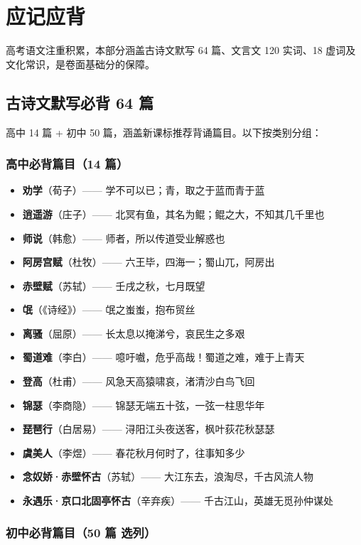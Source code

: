\section{应记应背}

高考语文注重积累，本部分涵盖古诗文默写 64 篇、文言文 120 实词、18 虚词及文化常识，是卷面基础分的保障。

\subsection{古诗文默写必背 64 篇}

高中 14 篇 + 初中 50 篇，涵盖新课标推荐背诵篇目。以下按类别分组：

\subsubsection{高中必背篇目（14 篇）}

\begin{itemize}
  \item \textbf{劝学}（荀子）—— 学不可以已；青，取之于蓝而青于蓝
  \item \textbf{逍遥游}（庄子）—— 北冥有鱼，其名为鲲；鲲之大，不知其几千里也
  \item \textbf{师说}（韩愈）—— 师者，所以传道受业解惑也
  \item \textbf{阿房宫赋}（杜牧）—— 六王毕，四海一；蜀山兀，阿房出
  \item \textbf{赤壁赋}（苏轼）—— 壬戌之秋，七月既望
  \item \textbf{氓}（《诗经》）—— 氓之蚩蚩，抱布贸丝
  \item \textbf{离骚}（屈原）—— 长太息以掩涕兮，哀民生之多艰
  \item \textbf{蜀道难}（李白）—— 噫吁嚱，危乎高哉！蜀道之难，难于上青天
  \item \textbf{登高}（杜甫）—— 风急天高猿啸哀，渚清沙白鸟飞回
  \item \textbf{锦瑟}（李商隐）—— 锦瑟无端五十弦，一弦一柱思华年
  \item \textbf{琵琶行}（白居易）—— 浔阳江头夜送客，枫叶荻花秋瑟瑟
  \item \textbf{虞美人}（李煜）—— 春花秋月何时了，往事知多少
  \item \textbf{念奴娇·赤壁怀古}（苏轼）—— 大江东去，浪淘尽，千古风流人物
  \item \textbf{永遇乐·京口北固亭怀古}（辛弃疾）—— 千古江山，英雄无觅孙仲谋处
\end{itemize}

\subsubsection{初中必背篇目（50 篇 选列）}

